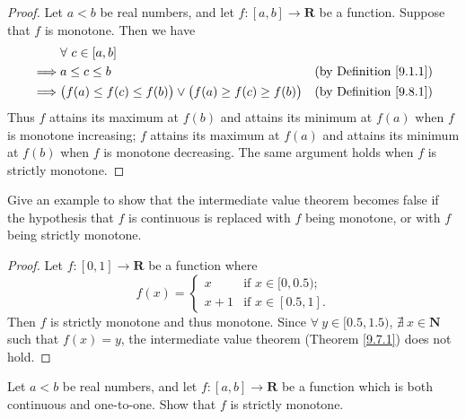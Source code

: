\begin{proof}
    Let \(a < b\) be real numbers, and let \(f : [a, b] \to \mathbf{R}\) be a function.
    Suppose that \(f\) is monotone.
    Then we have
    \begin{align*}
                 & \forall\ c \in [a, b]                                                                                           \\
        \implies & a \leq c \leq b                                                            & \text{(by Definition \ref{9.1.1})} \\
        \implies & \big(f(a) \leq f(c) \leq f(b)\big) \lor \big(f(a) \geq f(c) \geq f(b)\big) & \text{(by Definition \ref{9.8.1})} \\
    \end{align*}
    Thus \(f\) attains its maximum at \(f(b)\) and attains its minimum at \(f(a)\) when \(f\) is monotone increasing;
    \(f\) attains its maximum at \(f(a)\) and attains its minimum at \(f(b)\) when \(f\) is monotone decreasing.
    The same argument holds when \(f\) is strictly monotone.
\end{proof}

\begin{exercise}\label{ex 9.8.2}
    Give an example to show that the intermediate value theorem becomes false if the hypothesis that \(f\) is continuous is replaced with \(f\) being monotone, or with \(f\) being strictly monotone.
\end{exercise}

\begin{proof}
    Let \(f : [0, 1] \to \mathbf{R}\) be a function where
    \[
        f(x) = \begin{cases}
            x     & \text{if } x \in [0, 0.5); \\
            x + 1 & \text{if } x \in [0.5, 1].
        \end{cases}
    \]
    Then \(f\) is strictly monotone and thus monotone.
    Since \(\forall\ y \in [0.5, 1.5)\), \(\nexists\ x \in \mathbf{N}\) such that \(f(x) = y\), the intermediate value theorem (Theorem \ref{9.7.1}) does not hold.
\end{proof}

\begin{exercise}\label{ex 9.8.3}
    Let \(a < b\) be real numbers, and let \(f : [a, b] \to \mathbf{R}\) be a function which is both continuous and one-to-one.
    Show that \(f\) is strictly monotone.
\end{exercise}

